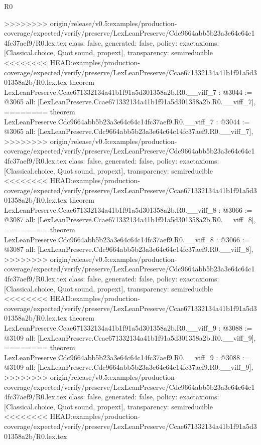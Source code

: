 \begin{lexlean}{R0}
\begin{coremodule}
{{{{{{{{{{{{{{{{{{{{{{{{{{{{{{{{{{{{{{{{{{{{{{{{{{{{{{{{{{{{{{{{>>>>>>>> origin/release/v0.5:examples/production-coverage/expected/verify/preserve/LexLeanPreserve/Cdc9664abb5b23a3e64c64c14fc37aef9/R0.lex.tex
  class: false,
  generated: false,
  policy: exact{axioms: [Classical.choice, Quot.sound, propext]},
  transparency: semireducible
}
<<<<<<<< HEAD:examples/production-coverage/expected/verify/preserve/LexLeanPreserve/Ccae671332134a41b1f91a5d301358a2b/R0.lex.tex
theorem LexLeanPreserve.Ccae671332134a41b1f91a5d301358a2b.R0.__viff_7 : @3044 := @3065 {
  all: [LexLeanPreserve.Ccae671332134a41b1f91a5d301358a2b.R0.__viff_7],
========
theorem LexLeanPreserve.Cdc9664abb5b23a3e64c64c14fc37aef9.R0.__viff_7 : @3044 := @3065 {
  all: [LexLeanPreserve.Cdc9664abb5b23a3e64c64c14fc37aef9.R0.__viff_7],
>>>>>>>> origin/release/v0.5:examples/production-coverage/expected/verify/preserve/LexLeanPreserve/Cdc9664abb5b23a3e64c64c14fc37aef9/R0.lex.tex
  class: false,
  generated: false,
  policy: exact{axioms: [Classical.choice, Quot.sound, propext]},
  transparency: semireducible
}
<<<<<<<< HEAD:examples/production-coverage/expected/verify/preserve/LexLeanPreserve/Ccae671332134a41b1f91a5d301358a2b/R0.lex.tex
theorem LexLeanPreserve.Ccae671332134a41b1f91a5d301358a2b.R0.__viff_8 : @3066 := @3087 {
  all: [LexLeanPreserve.Ccae671332134a41b1f91a5d301358a2b.R0.__viff_8],
========
theorem LexLeanPreserve.Cdc9664abb5b23a3e64c64c14fc37aef9.R0.__viff_8 : @3066 := @3087 {
  all: [LexLeanPreserve.Cdc9664abb5b23a3e64c64c14fc37aef9.R0.__viff_8],
>>>>>>>> origin/release/v0.5:examples/production-coverage/expected/verify/preserve/LexLeanPreserve/Cdc9664abb5b23a3e64c64c14fc37aef9/R0.lex.tex
  class: false,
  generated: false,
  policy: exact{axioms: [Classical.choice, Quot.sound, propext]},
  transparency: semireducible
}
<<<<<<<< HEAD:examples/production-coverage/expected/verify/preserve/LexLeanPreserve/Ccae671332134a41b1f91a5d301358a2b/R0.lex.tex
theorem LexLeanPreserve.Ccae671332134a41b1f91a5d301358a2b.R0.__viff_9 : @3088 := @3109 {
  all: [LexLeanPreserve.Ccae671332134a41b1f91a5d301358a2b.R0.__viff_9],
========
theorem LexLeanPreserve.Cdc9664abb5b23a3e64c64c14fc37aef9.R0.__viff_9 : @3088 := @3109 {
  all: [LexLeanPreserve.Cdc9664abb5b23a3e64c64c14fc37aef9.R0.__viff_9],
>>>>>>>> origin/release/v0.5:examples/production-coverage/expected/verify/preserve/LexLeanPreserve/Cdc9664abb5b23a3e64c64c14fc37aef9/R0.lex.tex
  class: false,
  generated: false,
  policy: exact{axioms: [Classical.choice, Quot.sound, propext]},
  transparency: semireducible
}
<<<<<<<< HEAD:examples/production-coverage/expected/verify/preserve/LexLeanPreserve/Ccae671332134a41b1f91a5d301358a2b/R0.lex.tex
}}}}}}}}}}}}}}}}}}}}}}}}}}}}}}}}}}}}}}}}}}}}}}}}}}}}}}}}}}}}}}}}}}
\end{coremodule}
\end{lexlean}

